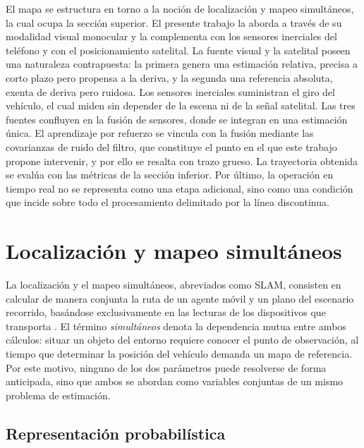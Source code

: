 El mapa se estructura en torno a la noción de localización y mapeo simultáneos, la cual ocupa la sección superior.
El presente trabajo la aborda a través de su modalidad visual monocular y la complementa con los sensores inerciales del teléfono y con el posicionamiento satelital.
La fuente visual y la satelital poseen una naturaleza contrapuesta: la primera genera una estimación relativa, precisa a corto plazo pero propensa a la deriva, y la segunda una referencia absoluta, exenta de deriva pero ruidosa.
Los sensores inerciales suministran el giro del vehículo, el cual miden sin depender de la escena ni de la señal satelital.
Las tres fuentes confluyen en la fusión de sensores, donde se integran en una estimación única.
El aprendizaje por refuerzo se vincula con la fusión mediante las covarianzas de ruido del filtro, que constituye el punto en el que este trabajo propone intervenir, y por ello se resalta con trazo grueso.
La trayectoria obtenida se evalúa con las métricas de la sección inferior.
Por último, la operación en tiempo real no se representa como una etapa adicional, sino como una condición que incide sobre todo el procesamiento delimitado por la línea discontinua.

\section{Localización y mapeo simultáneos}
\label{sec:slam}

La localización y el mapeo simultáneos, abreviados como SLAM, consisten en calcular de manera conjunta la ruta de un agente móvil y un plano del escenario recorrido, basándose exclusivamente en las lecturas de los dispositivos que transporta \cite{cadena2016slam}.
El término \textit{simultáneos} denota la dependencia mutua entre ambos cálculos: situar un objeto del entorno requiere conocer el punto de observación, al tiempo que determinar la posición del vehículo demanda un mapa de referencia.
Por este motivo, ninguno de los dos parámetros puede resolverse de forma anticipada, sino que ambos se abordan como variables conjuntas de un mismo problema de estimación.

\subsection{Representación probabilística}
\label{sec:slam-prob}

